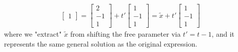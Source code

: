 {\begin{align*}
\begin{bmatrix}
1
\end{bmatrix}
=
\begin{bmatrix}
2 \\
-1 \\
1
\end{bmatrix}
+
t'
\begin{bmatrix}
1 \\
-1 \\
1
\end{bmatrix}
= \tilde{x} + t'
\begin{bmatrix}
1 \\
-1 \\
1
\end{bmatrix}
\end{align*}
where we "extract" $\tilde{x}$ from shifting the free parameter via $t' = t-1$, and it represents the same general solution as the original expression.}\\
\par
